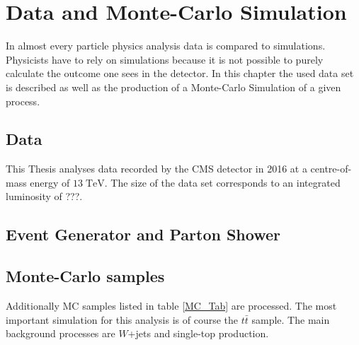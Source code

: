 \chapter{Data and Monte-Carlo Simulation}
	In almost every particle physics analysis data is compared to simulations. Physicists have to rely on simulations because it is not possible to purely calculate the outcome one sees in the detector. In this chapter the used data set is described as well as the production of a Monte-Carlo Simulation of a given process.
	\section{Data}
	This Thesis analyses data recorded by the CMS detector in 2016 at a centre-of-mass energy of $13\;\text{TeV}$. The size of the data set corresponds to an integrated luminosity of ???. 
	\section{Event Generator and Parton Shower}
	\section{Monte-Carlo samples}
	Additionally MC samples listed in table \ref{MC_Tab} are processed. The most important simulation for this analysis is of course the $t\bar{t}$ sample. The main background processes are $W$+jets and single-top production.
	
